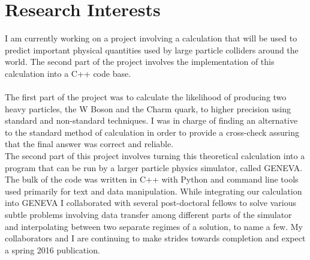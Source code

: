 \documentclass[10pt, a4paper]{article}
\newcommand{\years}[1]{\marginnote{\scriptsize #1}}
\begin{document}
\section*{Research Interests}
 \years{2013-}I am currently working on a project involving a calculation that will be used to predict important physical quantities used by large particle colliders around the world. The second part of the project involves the implementation of this calculation into a C++ code base. \\
 \\
The first part of the project was to calculate the likelihood of producing two heavy particles, the W Boson and the Charm quark, to higher precision using standard and non-standard techniques. I was in charge of finding an alternative to the standard method of calculation in order to provide a cross-check assuring that the final answer was correct and reliable. \newline
\\
The second part of this project involves turning this theoretical calculation into a program that can be run by a larger particle physics simulator, called GENEVA. The bulk of the code was written in C++ with Python and command line tools used primarily for text and data manipulation. While integrating our calculation into GENEVA I collaborated with several post-doctoral fellows to solve various subtle problems involving data transfer among different parts of the simulator and interpolating between two separate regimes of a solution, to name a few. My collaborators and I are continuing to make strides towards completion and expect a spring 2016 publication. 
\end{document}

